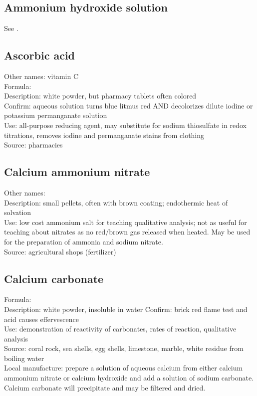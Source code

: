 \subsection{Ammonium hydroxide solution}
See .
\subsection{Ascorbic acid}
Other names: vitamin C\\
Formula: \\
Description: white powder, 
but pharmacy tablets often colored\\
Confirm: aqueous solution turns blue litmus red 
AND decolorizes dilute iodine or potassium permanganate solution\\
Use: all-purpose reducing agent, 
may substitute for sodium thiosulfate in redox titrations, 
removes iodine and permanganate stains from clothing\\
Source: pharmacies
\subsection{Calcium ammonium nitrate}
Other names: \\
Description: small pellets, 
often with brown coating; 
endothermic heat of solvation\\
Use: low cost ammonium salt for teaching qualitative analysis; 
not as useful for teaching about nitrates 
as no red/brown gas released when heated. 
May be used for the preparation of ammonia and sodium nitrate.\\
Source: agricultural shops (fertilizer)\\
\subsection{Calcium carbonate}
Formula: \\
Description: white powder, 
insoluble in water
Confirm: brick red flame test and acid causes effervescence\\
Use: demonstration of reactivity of carbonates, 
rates of reaction, 
qualitative analysis\\
Source: coral rock, 
sea shells, 
egg shells, 
limestone, 
marble, 
white residue from boiling water\\
Local manufacture: prepare a solution of aqueous calcium 
from either calcium ammonium nitrate or calcium hydroxide 
and add a solution of sodium carbonate.\\ 
Calcium carbonate will precipitate and may be filtered and dried.
